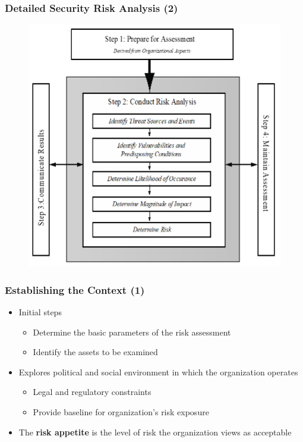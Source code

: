 \documentclass[xcolor ={table,usenames,dvipsnames}]{beamer}
\theoremstyle{definition}
\begin{document}
	\begin{frame}
		\frametitle{Detailed Security Risk Analysis (2)}
		\begin{figure}[h!]
			\centering
			\includegraphics[scale=0.47]{img/img_10.PNG}
			\label{Interfacce di un CS}
		\end{figure}
	\end{frame}

	\begin{frame}
		\frametitle{Establishing the Context (1)}
		\begin{itemize}
			\item	Initial steps 
			\begin{itemize}
				\item Determine the basic parameters of the risk assessment
				\item Identify the assets to be examined
			\end{itemize}
			\item Explores political and social environment in which the organization operates \begin{itemize}
				\item 	Legal and regulatory constraints
				\item	Provide baseline for organization’s risk exposure
			\end{itemize}
			\item The \textbf{risk appetite} is the level of risk the organization views as acceptable
		\end{itemize}	
	\end{frame}
\end{document}
